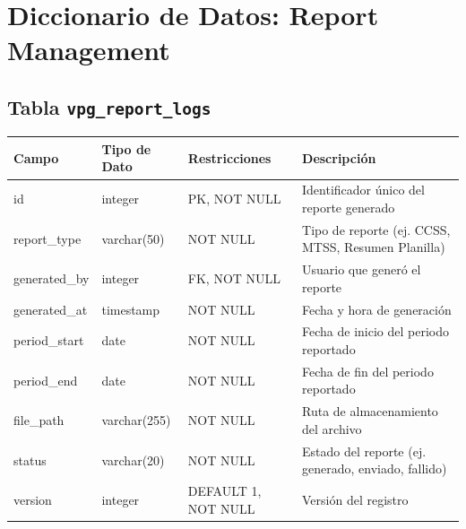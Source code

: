 \section{Diccionario de Datos: Report Management}
\begin{center}
	\subsection{Tabla \texttt{vpg\_report\_logs}}
	\small
	\begin{tabular}{|l|l|l|p{6cm}|}
		\hline
		\textbf{Campo} & \textbf{Tipo de Dato} & \textbf{Restricciones} & \textbf{Descripción}                                \\
		\hline
		id             & integer               & PK, NOT NULL           & Identificador único del reporte generado            \\
		report\_type   & varchar(50)           & NOT NULL               & Tipo de reporte (ej. CCSS, MTSS, Resumen Planilla)  \\
		generated\_by  & integer               & FK, NOT NULL           & Usuario que generó el reporte                       \\
		generated\_at  & timestamp             & NOT NULL               & Fecha y hora de generación                          \\
		period\_start  & date                  & NOT NULL               & Fecha de inicio del periodo reportado               \\
		period\_end    & date                  & NOT NULL               & Fecha de fin del periodo reportado                  \\
		file\_path     & varchar(255)          & NOT NULL               & Ruta de almacenamiento del archivo                  \\
		status         & varchar(20)           & NOT NULL               & Estado del reporte (ej. generado, enviado, fallido) \\
		version        & integer               & DEFAULT 1, NOT NULL    & Versión del registro                                \\
		\hline
	\end{tabular}
	\normalsize


\end{center}
